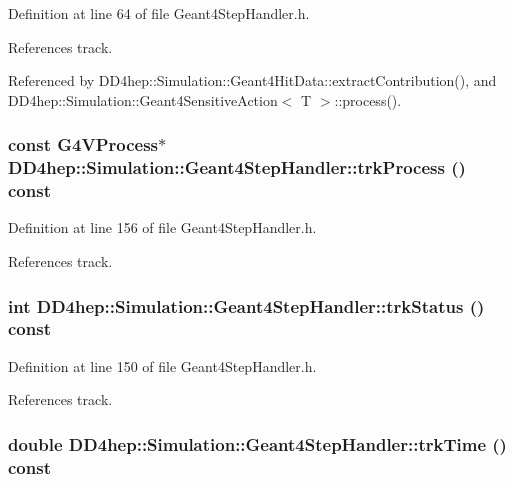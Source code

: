 Definition at line 64 of file Geant4StepHandler.h.

References track.

Referenced by DD4hep::Simulation::Geant4HitData::extractContribution(), and DD4hep::Simulation::Geant4SensitiveAction$<$ T $>$::process().\hypertarget{class_d_d4hep_1_1_simulation_1_1_geant4_step_handler_a6935bbfe146b71fd4019a5ec0ea397a3}{
\subsubsection[{trkProcess}]{\setlength{\rightskip}{0pt plus 5cm}const G4VProcess$\ast$ DD4hep::Simulation::Geant4StepHandler::trkProcess () const}}
\label{class_d_d4hep_1_1_simulation_1_1_geant4_step_handler_a6935bbfe146b71fd4019a5ec0ea397a3}


Definition at line 156 of file Geant4StepHandler.h.

References track.\hypertarget{class_d_d4hep_1_1_simulation_1_1_geant4_step_handler_aba809cb57c873101356094271008c068}{
\subsubsection[{trkStatus}]{\setlength{\rightskip}{0pt plus 5cm}int DD4hep::Simulation::Geant4StepHandler::trkStatus () const}}
\label{class_d_d4hep_1_1_simulation_1_1_geant4_step_handler_aba809cb57c873101356094271008c068}


Definition at line 150 of file Geant4StepHandler.h.

References track.\hypertarget{class_d_d4hep_1_1_simulation_1_1_geant4_step_handler_a1962e84c22f2078e94e634fd7244172c}{
\subsubsection[{trkTime}]{\setlength{\rightskip}{0pt plus 5cm}double DD4hep::Simulation::Geant4StepHandler::trkTime () const}}
\label{class_d_d4hep_1_1_simulation_1_1_geant4_step_handler_a1962e84c22f2078e94e634fd7244172c}


